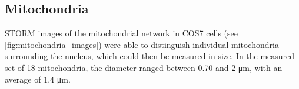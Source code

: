 \subsection{Mitochondria}
STORM images of the mitochondrial network in COS7 cells (see \autoref{fig:mitochondria_images}) were able to distinguish individual mitochondria surrounding the nucleus, which could then be measured in size.
In the measured set of 18 mitochondria, the diameter ranged between 0.70 and 2 \unit{\micro m}, with an average of $1.4$ \unit{\micro m}.
%
